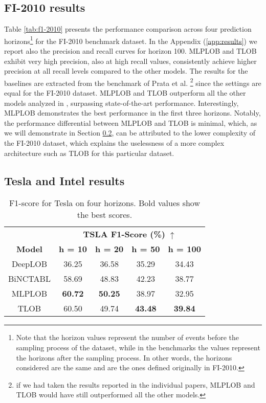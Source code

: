 \subsection{FI-2010 results}
Table \ref{tab:f1-2010} presents the performance comparison across four prediction horizons\footnote{Note that the horizon values represent the number of events before the sampling process of the dataset, while in the benchmarks \cite{prata2024lob, urn:nbn:fi:csc-kata20170601153214969115} the values represent the horizons after the sampling process. In other words, the horizons considered are the same and are the ones defined originally in FI-2010.} for the FI-2010 benchmark dataset. In the Appendix (\ref{app:results}) we report also the precision and recall curves for horizon 100. MLPLOB and TLOB exhibit very high precision, also at high recall values, consistently achieve higher precision at all recall levels compared to the other models.
The results for the baselines are extracted from the benchmark of Prata et al. \cite{prata2024lob}\footnote{if we had taken the results reported in the individual papers, MLPLOB and TLOB would have still outperformed all the other models.} since the settings are equal for the FI-2010 dataset. 
MLPLOB and TLOB outperform all the other models analyzed in \cite{prata2024lob}, surpassing state-of-the-art performance. Interestingly, MLPLOB demonstrates the best performance in the first three horizons. Notably, the performance differential between MLPLOB and TLOB is minimal, which, as we will demonstrate in Section \ref{sec:lobster}, can be attributed to the lower complexity of the FI-2010 dataset, which explains the uselessness of a more complex architecture such as TLOB for this particular dataset.

\subsection{Tesla and Intel results}
\label{sec:lobster}
\begin{table}[h!]
\centering
\begin{minipage}{0.48\textwidth}
\centering
\caption{F1-score for Tesla on four horizons. Bold values show the best scores.} 
\label{tab:tesla}
\centering
        \begin{tabular}{c|cccc}
            \toprule
            & \multicolumn{4}{c}{\textbf{TSLA F1-Score (\%) }$\uparrow$} \\
            \cmidrule(lr){2-5} 
            \textbf{Model} & \textbf{h = 10} & \textbf{h = 20} & \textbf{h = 50} & \textbf{h = 100}  \\
            \midrule
            DeepLOB & 36.25 & 36.58 & 35.29 & 34.43 \\
            BiNCTABL & 58.69 & 48.83 & 42.23 & 38.77 \\
            \midrule
            MLPLOB & \textbf{60.72} & \textbf{50.25} & 38.97 & 32.95 \\
            TLOB & 60.50 & 49.74 & \textbf{43.48} & \textbf{39.84}   \\            \bottomrule
        \end{tabular}
        \end{minipage}
\end{table}

